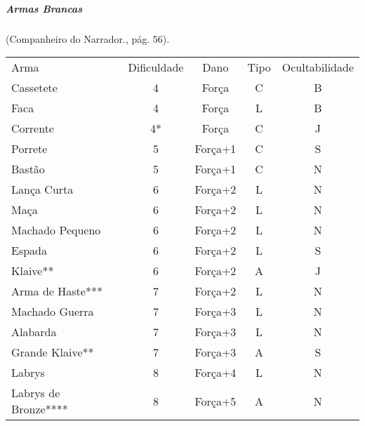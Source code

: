 \subparagraph{\bf Armas Brancas}(Companheiro do Narrador., pág. 56).

\begin{table}[!ht]
\centering
\label{tabela:Armas_brancas}
\begin{tabular}{|l c c c c|}
\hline
Arma            	& Dificuldade & Dano	& Tipo	& Ocultabilidade \\
\rowcolor[HTML]{EFEFEF} 
Cassetete       	& 4           & Força	& C		& B              \\
Faca            	& 4           & Força	& L		& B              \\
\rowcolor[HTML]{EFEFEF} 
Corrente        	& 4*          & Força	& C		& J              \\
Porrete         	& 5           & Força+1	& C 	& S              \\
\rowcolor[HTML]{EFEFEF} 
Bastão          	& 5           & Força+1 & C 	& N              \\
Lança Curta     	& 6           & Força+2 & L 	& N              \\
\rowcolor[HTML]{EFEFEF} 
Maça            	& 6           & Força+2 & L 	& N              \\
Machado Pequeno		& 6           & Força+2 & L 	& N              \\
\rowcolor[HTML]{EFEFEF} 
Espada          	& 6           & Força+2 & L 	& S              \\
Klaive**        	& 6           & Força+2 & A 	& J              \\
\rowcolor[HTML]{EFEFEF} 
Arma de Haste***  	& 7           & Força+2 & L 	& N              \\
Machado Guerra		& 7           & Força+3 & L 	& N              \\
\rowcolor[HTML]{EFEFEF} 
Alabarda        	& 7           & Força+3 & L 	& N              \\
Grande Klaive** 	& 7           & Força+3 & A 	& S              \\ 
\rowcolor[HTML]{EFEFEF} 
Labrys       		& 8           & Força+4 & L 	& N              \\
Labrys de Bronze****& 8           & Força+5 & A 	& N              \\
\hline
\end{tabular}
\end{table}

